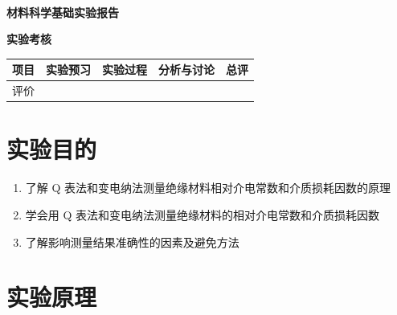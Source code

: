 \documentclass[a4paper,utf8]{article}
\begin{document}
\begin{center}
    {\mbox{}\\[7em]\bfseries\songti%
    材料科学基础实验报告}\\[34mm]
    {\bfseries\songti
    实验考核\\[3mm]
    \extrarowheight=3mm
    \begin{tabularx}{150mm}{|X|X|X|X|X|}\hline
        \hfil 项目 \hfil  & \hfil 实验预习 \hfil & \hfil 实验过程 \hfil & \hfil 分析与讨论 \hfil & \hfil 总评 \hfil \\[3mm] \hline
        \hfil 评价 \hfil &  &  &  &  \\[3mm] \hline
    \end{tabularx}
    }
\end{center}
\newpage
\section{实验目的}
    \begin{enumerate}
        \item 了解 Q 表法和变电纳法测量绝缘材料相对介电常数和介质损耗因数的原理
        \item 学会用 Q 表法和变电纳法测量绝缘材料的相对介电常数和介质损耗因数
        \item 了解影响测量结果准确性的因素及避免方法
    \end{enumerate}
\section{实验原理}%
\end{document}
